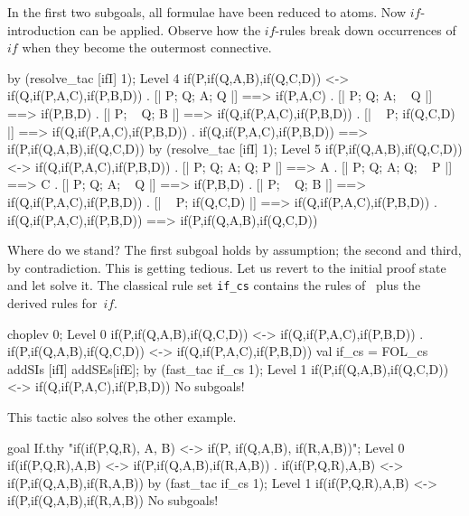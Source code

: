 In the first two subgoals, all formulae have been reduced to atoms.  Now
$if$-introduction can be applied.  Observe how the $if$-rules break down
occurrences of $if$ when they become the outermost connective.
\begin{ttbox}
by (resolve_tac [ifI] 1);
{\out Level 4}
{\out if(P,if(Q,A,B),if(Q,C,D)) <-> if(Q,if(P,A,C),if(P,B,D))}
{. [| P; Q; A; Q |] ==> if(P,A,C)}
{. [| P; Q; A; ~ Q |] ==> if(P,B,D)}
{. [| P; ~ Q; B |] ==> if(Q,if(P,A,C),if(P,B,D))}
{. [| ~ P; if(Q,C,D) |] ==> if(Q,if(P,A,C),if(P,B,D))}
{. if(Q,if(P,A,C),if(P,B,D)) ==> if(P,if(Q,A,B),if(Q,C,D))}
\ttbreak
by (resolve_tac [ifI] 1);
{\out Level 5}
{\out if(P,if(Q,A,B),if(Q,C,D)) <-> if(Q,if(P,A,C),if(P,B,D))}
{. [| P; Q; A; Q; P |] ==> A}
{. [| P; Q; A; Q; ~ P |] ==> C}
{. [| P; Q; A; ~ Q |] ==> if(P,B,D)}
{. [| P; ~ Q; B |] ==> if(Q,if(P,A,C),if(P,B,D))}
{. [| ~ P; if(Q,C,D) |] ==> if(Q,if(P,A,C),if(P,B,D))}
{. if(Q,if(P,A,C),if(P,B,D)) ==> if(P,if(Q,A,B),if(Q,C,D))}
\end{ttbox}
Where do we stand?  The first subgoal holds by assumption; the second and
third, by contradiction.  This is getting tedious.  Let us revert to the
initial proof state and let  solve it.  The classical
rule set {\tt if_cs} contains the rules of~{\FOL} plus the derived rules
for~$if$.
\begin{ttbox}
choplev 0;
{\out Level 0}
{\out if(P,if(Q,A,B),if(Q,C,D)) <-> if(Q,if(P,A,C),if(P,B,D))}
{. if(P,if(Q,A,B),if(Q,C,D)) <-> if(Q,if(P,A,C),if(P,B,D))}
val if_cs = FOL_cs addSIs [ifI] addSEs[ifE];
by (fast_tac if_cs 1);
{\out Level 1}
{\out if(P,if(Q,A,B),if(Q,C,D)) <-> if(Q,if(P,A,C),if(P,B,D))}
{\out No subgoals!}
\end{ttbox}
This tactic also solves the other example.
\begin{ttbox}
goal If.thy "if(if(P,Q,R), A, B) <-> if(P, if(Q,A,B), if(R,A,B))";
{\out Level 0}
{\out if(if(P,Q,R),A,B) <-> if(P,if(Q,A,B),if(R,A,B))}
{. if(if(P,Q,R),A,B) <-> if(P,if(Q,A,B),if(R,A,B))}
\ttbreak
by (fast_tac if_cs 1);
{\out Level 1}
{\out if(if(P,Q,R),A,B) <-> if(P,if(Q,A,B),if(R,A,B))}
{\out No subgoals!}
\end{ttbox}


